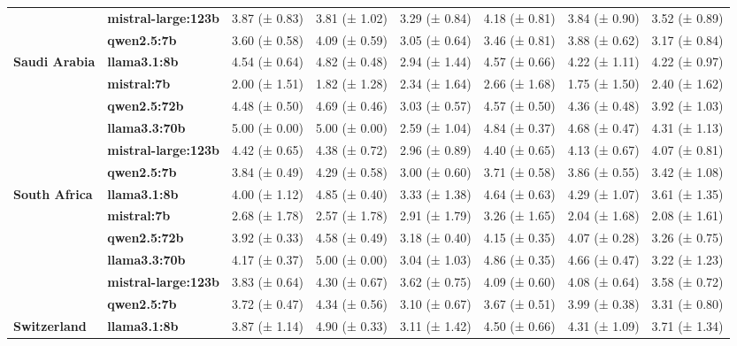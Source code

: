 \begin{tabular}{llllllll}
\textbf{} & \textbf{mistral-large:123b} & 3.87 (± 0.83) & 3.81 (± 1.02) & 3.29 (± 0.84) & 4.18 (± 0.81) & 3.84 (± 0.90) & 3.52 (± 0.89) \\
\textbf{} & \textbf{qwen2.5:7b} & 3.60 (± 0.58) & 4.09 (± 0.59) & 3.05 (± 0.64) & 3.46 (± 0.81) & 3.88 (± 0.62) & 3.17 (± 0.84) \\
\cline{1-8}
\multirow[t]{6}{*}{\textbf{Saudi Arabia}} & \textbf{llama3.1:8b} & 4.54 (± 0.64) & 4.82 (± 0.48) & 2.94 (± 1.44) & 4.57 (± 0.66) & 4.22 (± 1.11) & 4.22 (± 0.97) \\
\textbf{} & \textbf{mistral:7b} & 2.00 (± 1.51) & 1.82 (± 1.28) & 2.34 (± 1.64) & 2.66 (± 1.68) & 1.75 (± 1.50) & 2.40 (± 1.62) \\
\textbf{} & \textbf{qwen2.5:72b} & 4.48 (± 0.50) & 4.69 (± 0.46) & 3.03 (± 0.57) & 4.57 (± 0.50) & 4.36 (± 0.48) & 3.92 (± 1.03) \\
\textbf{} & \textbf{llama3.3:70b} & 5.00 (± 0.00) & 5.00 (± 0.00) & 2.59 (± 1.04) & 4.84 (± 0.37) & 4.68 (± 0.47) & 4.31 (± 1.13) \\
\textbf{} & \textbf{mistral-large:123b} & 4.42 (± 0.65) & 4.38 (± 0.72) & 2.96 (± 0.89) & 4.40 (± 0.65) & 4.13 (± 0.67) & 4.07 (± 0.81) \\
\textbf{} & \textbf{qwen2.5:7b} & 3.84 (± 0.49) & 4.29 (± 0.58) & 3.00 (± 0.60) & 3.71 (± 0.58) & 3.86 (± 0.55) & 3.42 (± 1.08) \\
\cline{1-8}
\multirow[t]{6}{*}{\textbf{South Africa}} & \textbf{llama3.1:8b} & 4.00 (± 1.12) & 4.85 (± 0.40) & 3.33 (± 1.38) & 4.64 (± 0.63) & 4.29 (± 1.07) & 3.61 (± 1.35) \\
\textbf{} & \textbf{mistral:7b} & 2.68 (± 1.78) & 2.57 (± 1.78) & 2.91 (± 1.79) & 3.26 (± 1.65) & 2.04 (± 1.68) & 2.08 (± 1.61) \\
\textbf{} & \textbf{qwen2.5:72b} & 3.92 (± 0.33) & 4.58 (± 0.49) & 3.18 (± 0.40) & 4.15 (± 0.35) & 4.07 (± 0.28) & 3.26 (± 0.75) \\
\textbf{} & \textbf{llama3.3:70b} & 4.17 (± 0.37) & 5.00 (± 0.00) & 3.04 (± 1.03) & 4.86 (± 0.35) & 4.66 (± 0.47) & 3.22 (± 1.23) \\
\textbf{} & \textbf{mistral-large:123b} & 3.83 (± 0.64) & 4.30 (± 0.67) & 3.62 (± 0.75) & 4.09 (± 0.60) & 4.08 (± 0.64) & 3.58 (± 0.72) \\
\textbf{} & \textbf{qwen2.5:7b} & 3.72 (± 0.47) & 4.34 (± 0.56) & 3.10 (± 0.67) & 3.67 (± 0.51) & 3.99 (± 0.38) & 3.31 (± 0.80) \\
\cline{1-8}
\multirow[t]{6}{*}{\textbf{Switzerland}} & \textbf{llama3.1:8b} & 3.87 (± 1.14) & 4.90 (± 0.33) & 3.11 (± 1.42) & 4.50 (± 0.66) & 4.31 (± 1.09) & 3.71 (± 1.34) \\

\end{tabular}
